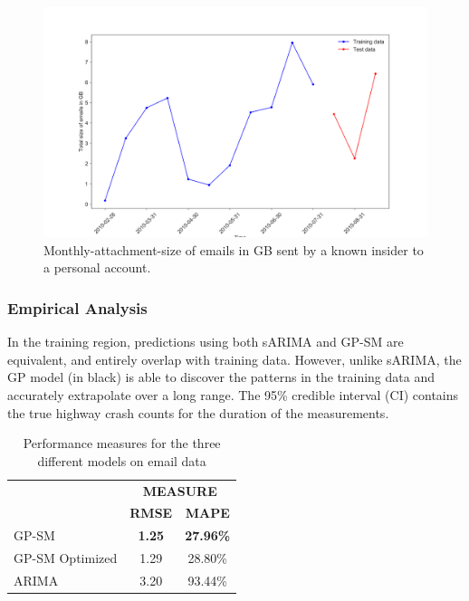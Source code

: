 \documentclass[letterpaper]{article}
\begin{document}
\begin{figure}[h]
\begin{center}
\includegraphics[width=\linewidth]{figures/data-email.png}
\caption{Monthly-attachment-size of emails in GB sent by a known insider to a personal account.}
\label{fig:fatal-crashes}
\end{center}
\end{figure}

\subsubsection{Empirical Analysis}

In the training region, predictions using both sARIMA and GP-SM are equivalent, and entirely overlap with training data. However, unlike sARIMA, the GP model (in black) is able to discover the patterns in the training data and accurately extrapolate over a long range. The 95\% credible interval (CI) contains the true highway crash counts for the duration of the measurements. 

\lipsum[1-2]

\begin{table}[h]
\caption{Performance measures for the three different models on email data}
\label{tab:descriptive-stats-emails}
\begin{center}
\begin{tabular}{l@{\qquad}cc}
  \toprule
  \multirow{2}{*}{\raisebox{-\heavyrulewidth}{\bf MODEL}} & \multicolumn{2}{c}{\bf MEASURE} \\
  \cmidrule{2-3}
  & {\bf RMSE} & {\bf MAPE} \\
  \midrule
  GP-SM & {\bf 1.25} & {\bf 27.96\%}  \\
  GP-SM Optimized & 1.29 & 28.80\%  \\
  ARIMA & 3.20 & 93.44\%  \\
  \bottomrule
\end{tabular}
\end{center}
\end{table}
\end{document}
